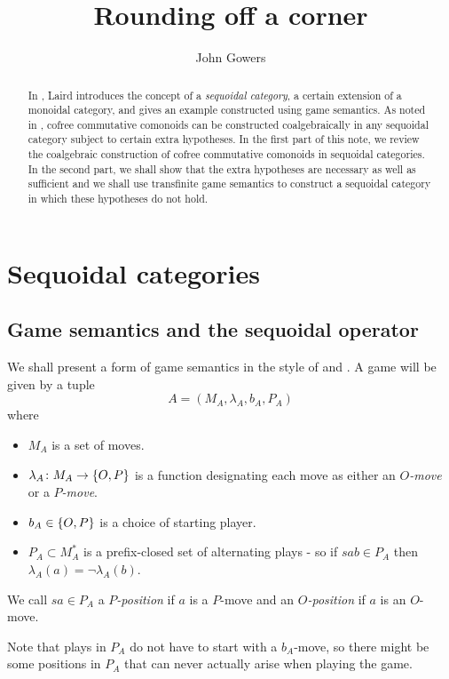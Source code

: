 \documentclass[11pt]{article}
\title{Rounding off a corner}
\author{John Gowers}
\begin{document}
\maketitle

\begin{abstract}
  In \cite{laird02}, Laird introduces the concept of a \emph{sequoidal category}, a certain extension of a monoidal category, and gives an example constructed using game semantics.  As noted in \cite{martinsthesis}, cofree commutative comonoids can be constructed coalgebraically in any sequoidal category subject to certain extra hypotheses.  In the first part of this note, we review the coalgebraic construction of cofree commutative comonoids in sequoidal categories.  In the second part, we shall show that the extra hypotheses are necessary as well as sufficient and we shall use transfinite game semantics to construct a sequoidal category in which these hypotheses do not hold.
\end{abstract}

\section{Sequoidal categories}

\subsection{Game semantics and the sequoidal operator}

We shall present a form of game semantics in the style of \cite{hyland1997games} and \cite{abramskyjagadeesangames}.  A game will be given by a tuple
\[
  A = (M_A, \lambda_A, b_A, P_A)
  \]
where
\begin{itemize}
  \item $M_A$ is a set of moves.
  \item $\lambda_A\colon M_A\to\{O,P\}$ is a function designating each move as either an \emph{$O$-move} or a \emph{$P$-move}.
  \item $b_A\in\{O,P\}$ is a choice of starting player.
  \item $P_A\subset M_A^*$ is a prefix-closed set of alternating plays - so if $sab\in P_A$ then $\lambda_A(a)=\neg\lambda_A(b)$.
\end{itemize}

We call $sa\in P_A$ a \emph{$P$-position} if $a$ is a $P$-move and an \emph{$O$-position} if $a$ is an $O$-move.

Note that plays in $P_A$ do not have to start with a $b_A$-move, so there might be some positions in $P_A$ that can never actually arise when playing the game.
\end{document}
